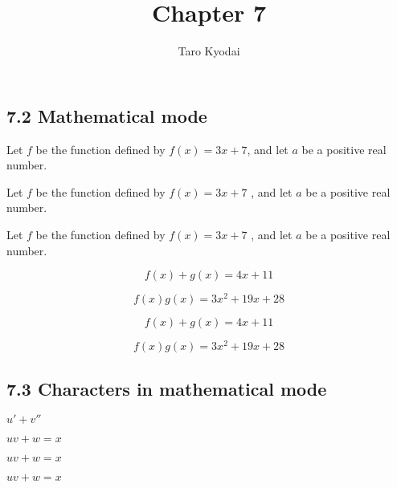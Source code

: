 \documentclass{article} %
\title{Chapter 7}
\author{Taro Kyodai}
\begin{document}
\maketitle

\subsection*{7.2 Mathematical mode}


Let $f$ be the function defined by $f(x) = 3x + 7$, and
let $a$ be a positive real number.

Let $f$ be the function defined by
$
f(x) = 3x + 7
$
, and let $a$ be a positive real number.

Let
$
f
$
be the function defined by
$
f(x) = 3x + 7
$
, and let
$
a
$
be a positive real number.


\begin{equation}
  f(x) + g(x) = 4x +11
\end{equation}

\begin{equation}
  f(x)g(x) = 3x^2 + 19x + 28
\end{equation}


\[
  f(x) + g(x) = 4x +11
\]

\[
  f(x)g(x) = 3x^2 + 19x + 28
\]


\subsection*{7.3 Characters in mathematical mode}

$u' + v''$


$u         v + w =x$

$uv+w=x$

$uv + w = x$


\end{document}
